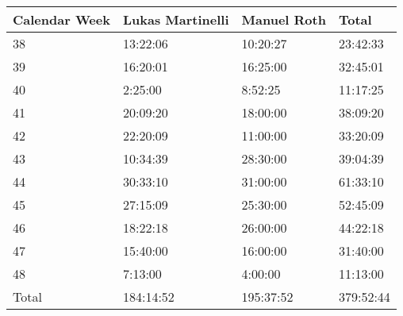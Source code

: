 \begin{center}
    \begin{tabular}{llll}
    \hline
     Calendar Week & Lukas Martinelli & Manuel Roth & Total    \\
    \hline
    38     & 13:22:06         & 10:20:27    & 23:42:33  \\
    39     & 16:20:01         & 16:25:00    & 32:45:01  \\
    40     & 2:25:00          & 8:52:25     & 11:17:25  \\
    41     & 20:09:20         & 18:00:00    & 38:09:20  \\
    42     & 22:20:09         & 11:00:00    & 33:20:09  \\
    43     & 10:34:39         & 28:30:00    & 39:04:39  \\
    44     & 30:33:10         & 31:00:00    & 61:33:10  \\
    45     & 27:15:09         & 25:30:00    & 52:45:09  \\
    46     & 18:22:18         & 26:00:00    & 44:22:18  \\
    47     & 15:40:00         & 16:00:00    & 31:40:00  \\
    48     & 7:13:00          & 4:00:00     & 11:13:00  \\
    \hline
    Total & 184:14:52        & 195:37:52   & 379:52:44 \\
    \end{tabular}
\end{center}

\newpage